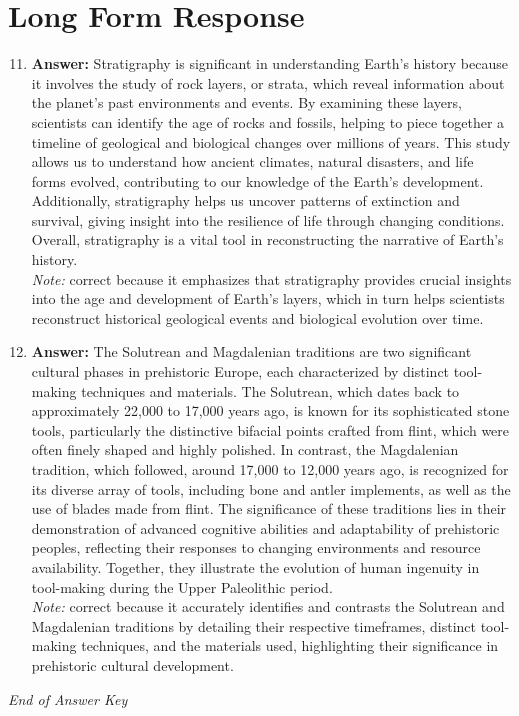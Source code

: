 \documentclass[12pt]{article}
\begin{document}
\section*{Long Form Response}
\begin{enumerate}[label=\arabic*.]
\setcounter{enumi}{10}
\item \textbf{Answer:} Stratigraphy is significant in understanding Earth's history because it involves the study of rock layers, or strata, which reveal information about the planet's past environments and events. By examining these layers, scientists can identify the age of rocks and fossils, helping to piece together a timeline of geological and biological changes over millions of years. This study allows us to understand how ancient climates, natural disasters, and life forms evolved, contributing to our knowledge of the Earth's development. Additionally, stratigraphy helps us uncover patterns of extinction and survival, giving insight into the resilience of life through changing conditions. Overall, stratigraphy is a vital tool in reconstructing the narrative of Earth's history.
\\ \textit{Note:} correct because it emphasizes that stratigraphy provides crucial insights into the age and development of Earth's layers, which in turn helps scientists reconstruct historical geological events and biological evolution over time.
\item \textbf{Answer:} The Solutrean and Magdalenian traditions are two significant cultural phases in prehistoric Europe, each characterized by distinct tool-making techniques and materials. The Solutrean, which dates back to approximately 22,000 to 17,000 years ago, is known for its sophisticated stone tools, particularly the distinctive bifacial points crafted from flint, which were often finely shaped and highly polished. In contrast, the Magdalenian tradition, which followed, around 17,000 to 12,000 years ago, is recognized for its diverse array of tools, including bone and antler implements, as well as the use of blades made from flint. The significance of these traditions lies in their demonstration of advanced cognitive abilities and adaptability of prehistoric peoples, reflecting their responses to changing environments and resource availability. Together, they illustrate the evolution of human ingenuity in tool-making during the Upper Paleolithic period.
\\ \textit{Note:} correct because it accurately identifies and contrasts the Solutrean and Magdalenian traditions by detailing their respective timeframes, distinct tool-making techniques, and the materials used, highlighting their significance in prehistoric cultural development.
\end{enumerate}

\vfill
\noindent\textit{End of Answer Key}
\end{document}
